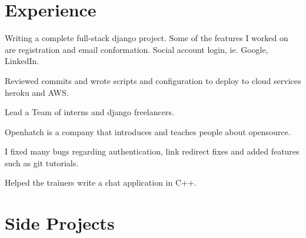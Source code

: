 \documentclass[]{deedy-resume-openfont}
\begin{document}
\begin{minipage}[t]{0.66\textwidth}


\section{Experience}



\vspace{\topsep} %
\begin{tightemize}
\item Writing a complete full-stack django project. Some of the features I worked on are registration and email conformation. Social account login, ie. Google, LinkedIn.
\item Reviewed commits and wrote scripts and configuration to deploy to cloud services heroku and AWS.
\item Lead a Team of interns and django freelancers.\end{tightemize}

\begin{tightemize}
\item Openhatch is a company that introduces and teaches people about opensource.\item I fixed many bugs regarding authentication, link redirect fixes and added features such as git tutorials.\end{tightemize}
\sectionsep

\begin{tightemize}\item Helped the trainers write a chat application in C++.
\end{tightemize}
\sectionsep


\section{Side Projects}


\end{minipage}
\end{document}
